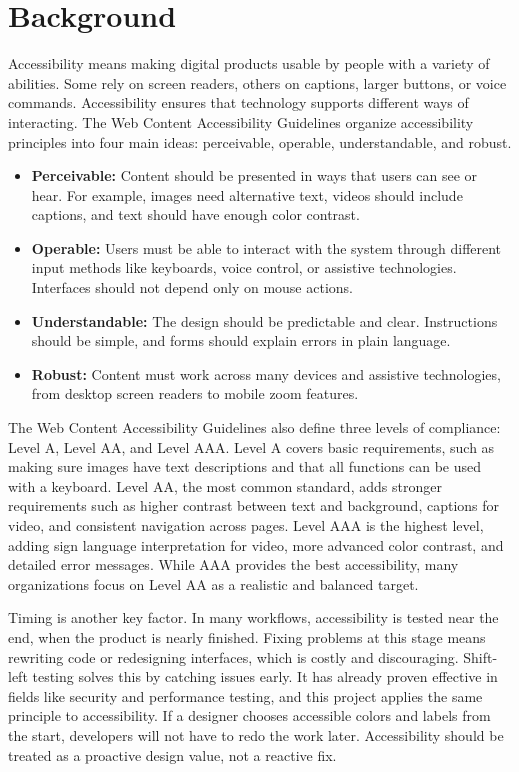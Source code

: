 \documentclass[12pt]{article}
\begin{document}
\section{Background}
Accessibility means making digital products usable by people with a variety of abilities. Some rely
on screen readers, others on captions, larger buttons, or voice commands. Accessibility ensures
that technology supports different ways of interacting. The Web Content Accessibility Guidelines
organize accessibility principles into four main ideas: perceivable, operable, understandable, and robust.

\begin{itemize}
    \item \textbf{Perceivable:} Content should be presented in ways that users can see or hear. For example,
    images need alternative text, videos should include captions, and text should have enough color contrast.
    \item \textbf{Operable:} Users must be able to interact with the system through different input methods
    like keyboards, voice control, or assistive technologies. Interfaces should not depend only on mouse actions.
    \item \textbf{Understandable:} The design should be predictable and clear. Instructions should be simple,
    and forms should explain errors in plain language. 
    \item \textbf{Robust:} Content must work across many devices and assistive technologies, from desktop
    screen readers to mobile zoom features.
\end{itemize}

The Web Content Accessibility Guidelines also define three levels of compliance: Level A, Level AA,
and Level AAA. Level A covers basic requirements, such as making sure images have text descriptions
and that all functions can be used with a keyboard. Level AA, the most common standard, adds stronger
requirements such as higher contrast between text and background, captions for video, and consistent
navigation across pages. Level AAA is the highest level, adding sign language interpretation for video,
more advanced color contrast, and detailed error messages. While AAA provides the best accessibility,
many organizations focus on Level AA as a realistic and balanced target.

Timing is another key factor. In many workflows, accessibility is tested near the end, when the product
is nearly finished. Fixing problems at this stage means rewriting code or redesigning interfaces, which is
costly and discouraging. Shift-left testing solves this by catching issues early. It has already proven effective
in fields like security and performance testing, and this project applies the same principle to accessibility.
If a designer chooses accessible colors and labels from the start, developers will not have to redo the work later.
Accessibility should be treated as a proactive design value, not a reactive fix.
\end{document}
